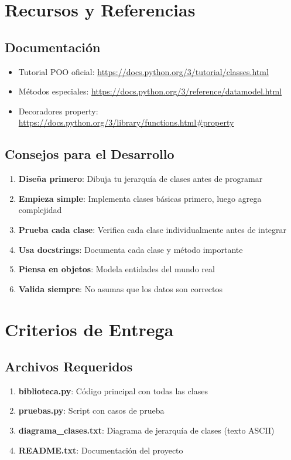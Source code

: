 \documentclass[11pt,letterpaper]{article}
\begin{document}
\section{Recursos y Referencias}

\subsection{Documentación}

\begin{itemize}
    \item Tutorial POO oficial: \url{https://docs.python.org/3/tutorial/classes.html}
    \item Métodos especiales: \url{https://docs.python.org/3/reference/datamodel.html}
    \item Decoradores property: \url{https://docs.python.org/3/library/functions.html#property}
\end{itemize}

\subsection{Consejos para el Desarrollo}

\begin{enumerate}
    \item \textbf{Diseña primero}: Dibuja tu jerarquía de clases antes de programar
    \item \textbf{Empieza simple}: Implementa clases básicas primero, luego agrega complejidad
    \item \textbf{Prueba cada clase}: Verifica cada clase individualmente antes de integrar
    \item \textbf{Usa docstrings}: Documenta cada clase y método importante
    \item \textbf{Piensa en objetos}: Modela entidades del mundo real
    \item \textbf{Valida siempre}: No asumas que los datos son correctos
\end{enumerate}

\section{Criterios de Entrega}

\subsection{Archivos Requeridos}

\begin{enumerate}
    \item \textbf{biblioteca.py}: Código principal con todas las clases
    \item \textbf{pruebas.py}: Script con casos de prueba
    \item \textbf{diagrama\_clases.txt}: Diagrama de jerarquía de clases (texto ASCII)
    \item \textbf{README.txt}: Documentación del proyecto
\end{enumerate}
\end{document}
